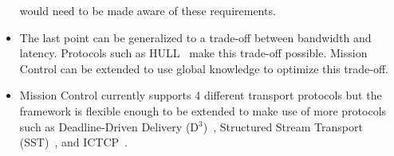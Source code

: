 \documentclass[a4paper,12pt,twoside,openright]{report}
\begin{document}
\begin{itemize}
	would need to be made aware of these requirements.
	\item The last point can be generalized to a trade-off between bandwidth and
	latency. Protocols such as HULL~\cite{Alizadeh:2012:LIM} make this trade-off
	possible. Mission Control can be extended to use global knowledge to optimize
	this trade-off.
	\item Mission Control currently supports 4 different transport protocols but
	the framework is flexible enough to be extended to make use of more protocols
	such as Deadline-Driven Delivery (D$^3$)~\cite{Wilson:2011:BNL}, Structured Stream
	Transport (SST)~\cite{Ford:2007:SSN}, and ICTCP~\cite{Wu:2010:IIC}.
\end{itemize}

\appendix
\singlespacing

 
 
\end{document}
